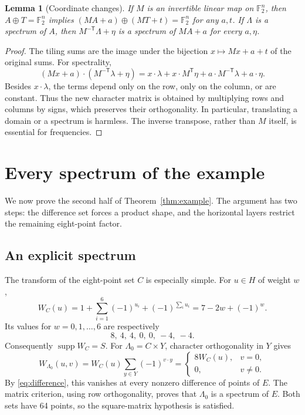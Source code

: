 \documentclass[11pt]{article}
\numberwithin{equation}{section}
\newtheorem{lemma}[theorem]{Lemma}
\theoremstyle{definition}
\theoremstyle{remark}\newtheorem{remark}[theorem]{Remark}
\newcommand{\F}{\mathbb F_2}
\newcommand{\supp}{\operatorname{supp}}
\begin{document}
\begin{lemma}[Coordinate changes]\label{lem:affine}
If $M$ is an invertible linear map on $\F^n$, then $A\oplus T=\F^n$ implies $(MA+a)\oplus(MT+t)=\F^n$ for any $a,t$. If $\Lambda$ is a spectrum of $A$, then $M^{-\mathsf T}\Lambda+\eta$ is a spectrum of $MA+a$ for every $a,\eta$.
\end{lemma}
\begin{proof}
The tiling sums are the image under the bijection $x\mapsto Mx+a+t$ of the original sums. For spectrality,
\[
 (Mx+a)\cdot(M^{-\mathsf T}\lambda+\eta)
 =x\cdot\lambda+x\cdot M^{\mathsf T}\eta+a\cdot M^{-\mathsf T}\lambda+a\cdot\eta.
\]
Besides $x\cdot\lambda$, the terms depend only on the row, only on the column, or are constant. Thus the new character matrix is obtained by multiplying rows and columns by signs, which preserves their orthogonality. In particular, translating a domain or a spectrum is harmless. The inverse transpose, rather than $M$ itself, is essential for frequencies.
\end{proof}

\section{Every spectrum of the example}\label{sec:spectra}
We now prove the second half of Theorem~\ref{thm:example}. The argument has two steps: the difference set forces a product shape, and the horizontal layers restrict the remaining eight-point factor.

\subsection{An explicit spectrum}
The transform of the eight-point set $C$ is especially simple. For $u\in H$ of weight $w$,
\begin{equation}\label{eq:WC}
 W_C(u)=1+\sum_{i=1}^6(-1)^{u_i}+(-1)^{\sum_i u_i}
       =7-2w+(-1)^w.
\end{equation}
Its values for $w=0,1,\ldots,6$ are respectively
\[
 8,\ 4,\ 4,\ 0,\ 0,\ -4,\ -4.
\]
Consequently $\supp W_C=S$. For $\Lambda_0=C\times Y$, character orthogonality in $Y$ gives
\begin{equation}\label{eq:productW}
 W_{\Lambda_0}(u,v)=W_C(u)\sum_{y\in Y}(-1)^{v\cdot y}
 =\begin{cases}8W_C(u),&v=0,\\0,&v\ne0.\end{cases}
\end{equation}
By \eqref{eq:difference}, this vanishes at every nonzero difference of points of $E$. The matrix criterion, using row orthogonality, proves that $\Lambda_0$ is a spectrum of $E$. Both sets have 64 points, so the square-matrix hypothesis is satisfied.
\end{document}
